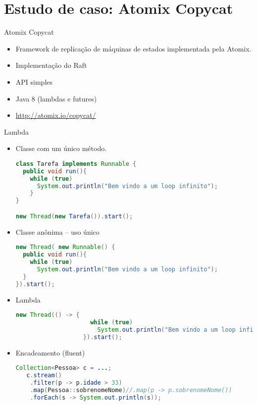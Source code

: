 \section{Estudo de caso: Atomix Copycat}
\begin{frame}{Atomix Copycat}
\begin{itemize}
\item Framework de replicação de máquinas de estados implementada pela Atomix. 
\item Implementação do Raft
\item API simples
\item Java 8 (lambdas e futures)
\item \url{http://atomix.io/copycat/}
\end{itemize}
\end{frame}

\begin{frame}{Lambda}
\begin{itemize}
	\item Classe com um único método.
	\begin{lstlisting}[language=java]
class Tarefa implements Runnable {
  public void run(){
    while (true)
      System.out.println("Bem vindo a um loop infinito");
    }   
}

new Thread(new Tarefa()).start();
	\end{lstlisting}

\framebreak

	\item Classe anônima -- uso único
\begin{lstlisting}[language=java]
new Thread( new Runnable() {
  public void run(){
    while (true)
      System.out.println("Bem vindo a um loop infinito");
  }   
}).start();
\end{lstlisting}

\framebreak

	\item Lambda
\begin{lstlisting}[language=java]
new Thread(() -> {
                     while (true)
                       System.out.println("Bem vindo a um loop infinito");
                   }).start();
\end{lstlisting}

\framebreak
   \item Encadeamento (fluent)
\begin{lstlisting}[language=java]
   Collection<Pessoa> c = ...;
   c.stream()
    .filter(p -> p.idade > 33)
    .map(Pessoa::sobrenomeNome)//.map(p -> p.sobrenomeNome())
    .forEach(s -> System.out.println(s));
\end{lstlisting}
\end{itemize}
\end{frame}

